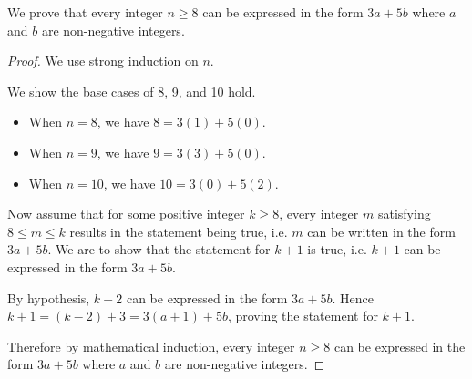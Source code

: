 \begin{example}
    We prove that every integer $n \geq 8$ can be expressed in the form $3a + 5b$ where $a$ and $b$ are non-negative integers.
    \begin{proof}
        We use strong induction on $n$.

        We show the base cases of 8, 9, and 10 hold.
        \begin{itemize}
            \item When $n = 8$, we have $8 = 3(1) + 5(0)$.
            \item When $n = 9$, we have $9 = 3(3) + 5(0)$.
            \item When $n = 10$, we have $10 = 3(0) + 5(2)$.
        \end{itemize}

        Now assume that for some positive integer $k \geq 8$, every integer $m$ satisfying $8 \leq m \leq k$ results in the statement being true, i.e. $m$ can be written in the form $3a + 5b$. We are to show that the statement for $k+1$ is true, i.e. $k+1$ can be expressed in the form $3a + 5b$.

        By hypothesis, $k - 2$ can be expressed in the form $3a+5b$. Hence $k+1 = (k-2) + 3 = 3(a+1) + 5b$, proving the statement for $k+1$.

        Therefore by mathematical induction, every integer $n \geq 8$ can be expressed in the form $3a + 5b$ where $a$ and $b$ are non-negative integers.
    \end{proof}
\end{example}

